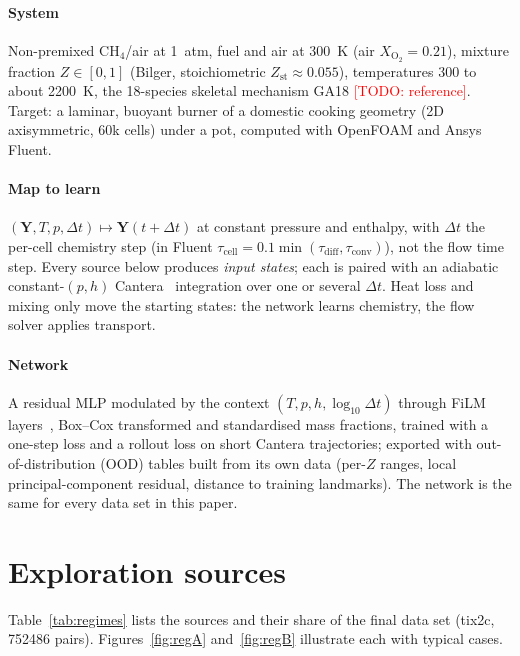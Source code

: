 \documentclass[preprint,review,12pt]{elsarticle}
\newcommand{\todo}[1]{\textcolor{red}{[TODO: #1]}}
\begin{document}
\paragraph{System} Non-premixed CH$_4$/air at 1~atm, fuel and air at 300~K (air $X_\mathrm{O_2}=0.21$), mixture
fraction $Z\in[0,1]$ (Bilger, stoichiometric $Z_\mathrm{st}\approx0.055$), temperatures 300 to about 2200~K, the
18-species skeletal mechanism GA18 \todo{reference}. Target: a laminar, buoyant burner of a domestic cooking
geometry (2D axisymmetric, 60k cells) under a pot, computed with OpenFOAM and Ansys Fluent.

\paragraph{Map to learn} $(\mathbf{Y},T,p,\Delta t)\mapsto\mathbf{Y}(t+\Delta t)$ at constant pressure and
enthalpy, with $\Delta t$ the per-cell chemistry step (in Fluent $\tau_\mathrm{cell}=0.1\min(\tau_\mathrm{diff},
\tau_\mathrm{conv})$), not the flow time step. Every source below produces \emph{input states}; each is paired with
an adiabatic constant-$(p,h)$ Cantera~\cite{cantera} integration over one or several $\Delta t$. Heat loss and
mixing only move the starting states: the network learns chemistry, the flow solver applies transport.

\paragraph{Network} A residual MLP modulated by the context $(T,p,h,\log_{10}\Delta t)$ through FiLM
layers~\cite{perez2018film}, Box--Cox transformed and standardised mass fractions, trained with a one-step loss and
a rollout loss on short Cantera trajectories; exported with out-of-distribution (OOD) tables built from its own data
(per-$Z$ ranges, local principal-component residual, distance to training landmarks). The network is the same
for every data set in this paper.

\section{Exploration sources}
\label{sec:sources}
Table~\ref{tab:regimes} lists the sources and their share of the final data set (tix2c, \num{752486} pairs).
Figures~\ref{fig:regA} and~\ref{fig:regB} illustrate each with typical cases.
\end{document}

